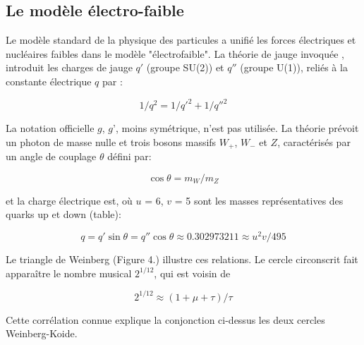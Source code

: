\documentclass[a4paper,9pt]{article}
\newcounter{row}
\begin{document}






\subsection {Le modèle électro-faible }
Le modèle standard de la physique des particules a unifié les forces électriques et nucléaires faibles dans le modèle "électrofaible". La théorie de jauge invoquée \cite{Taylor}, introduit les charges de jauge {$q'$} (groupe SU(2)) et {$q''$} (groupe U(1)), reliés à la constante électrique $q$ par :

\begin{equation}
 1/q^2 = 1/{q'}^2  + 1/{q''}^2 
 \end{equation}
 
La notation officielle $g$, {$g’$}, moins symétrique, n'est pas utilisée.
La théorie prévoit un photon de masse nulle et trois bosons massifs $W_{+}$, $W_{-}$ et $Z$, caractérisés par un angle de couplage $\theta$  défini par:

\begin{equation}
\cos\theta = m_W/m_Z 
\end{equation}
 
et la charge électrique est, où $u$ = 6, $v$ = 5 sont les masses représentatives des quarks up et down (table):

\begin{equation}
q = {q'} \sin\theta = {q''} \cos\theta \approx 0.302973211 \approx u^2v/495
\end{equation}

 
 Le triangle de Weinberg (Figure 4.) illustre ces relations.
 Le cercle circonscrit fait apparaître le nombre musical $2^{1/12}$, qui est voisin de 
 
 \begin{equation}
2^{1/12} \approx (1+\mu+\tau)/\tau
 \end{equation}
 
 Cette corrélation connue \cite{Sternheimer} explique la conjonction ci-dessus les deux cercles Weinberg-Koide. 
 
\end{document}

